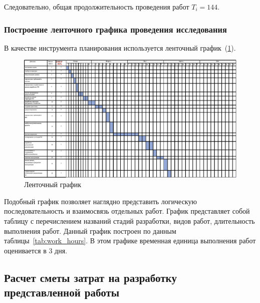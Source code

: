 Следовательно, общая продолжительность проведения работ $T_{i} = 144$.

\subsubsection{Построение ленточного графика проведения исследования}

В качестве инструмента планирования используется ленточный график~(\ref{fig:work_waterfall}).
\begin{figure}[H]
	\centering
	\includegraphics[width=.7\textheight,angle=90,origin=c]{images/work_waterfall}
	\parskip=6pt
	\caption{Ленточный график}
	\label{fig:work_waterfall}
\end{figure}

Подобный график позволяет наглядно представить логическую
последовательность и взаимосвязь отдельных работ. График представляет собой
таблицу с перечислением названий стадий разработки, видов работ, длительность выполнения работ. Данный график построен по данным таблицы~\ref{tab:work_hours}. В этом графике временная единица выполнения работ оценивается в 3 дня.

\subsection{Расчет сметы затрат на разработку представленной работы}

